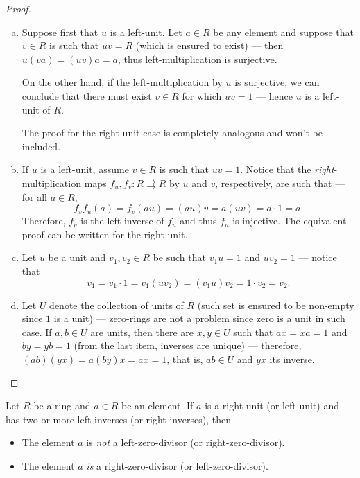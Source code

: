 %
\begin{proof}
\begin{enumerate}[(a)]\setlength\itemsep{0em}
\item Suppose first that \(u\) is a left-unit. Let \(a \in R\) be any element
  and suppose that \(v \in R\) is such that \(u v = R\) (which is ensured to
  exist) --- then \(u (v a) = (u v) a = a\), thus left-multiplication is
  surjective.

  On the other hand, if the left-multiplication by \(u\) is surjective, we can
  conclude that there must exist \(v \in R\) for which \(u v = 1\) --- hence
  \(u\) is a left-unit of \(R\).

  The proof for the right-unit case is completely analogous and won't be
  included.

\item If \(u\) is a left-unit, assume \(v \in R\) is such that
  \(u v = 1\). Notice that the \emph{right}-multiplication maps
  \(f_u, f_v: R \rightrightarrows R\) by \(u\) and \(v\), respectively, are such
  that --- for all \(a \in R\),
  \[
    f_v f_u(a) = f_v(a u) = (a u) v = a (u v) = a \cdot 1 = a.
  \]
  Therefore, \(f_v\) is the left-inverse of \(f_u\) and thus \(f_u\) is
  injective. The equivalent proof can be written for the right-unit.

\item Let \(u\) be a unit and \(v_1, v_2 \in R\) be such that \(v_1 u = 1\) and
  \(u v_2 = 1\) --- notice that
  \[
    v_1 = v_1 \cdot 1 = v_1 (u v_2) = (v_1 u) v_2 = 1 \cdot v_2 = v_2.
  \]


\item Let \(U\) denote the collection of units of \(R\) (such set is ensured to
  be non-empty since \(1\) is a unit) --- zero-rings are not a problem since
  zero is a unit in such case. If \(a, b \in U\) are units, then there are
  \(x, y \in U\) such that \(a x = x a = 1\) and \(b y = y b = 1\) (from the
  last item, inverses are unique) --- therefore,
  \((a b) (y x) = a (b y) x = a x = 1\), that is, \(a b \in U\) and \(y x\)
  its inverse.
\end{enumerate}
\end{proof}
%

%
\begin{lemma}
\label{lem:unit-two-or-more-inverses}
Let \(R\) be a ring and \(a \in R\) be an element. If \(a\) is a right-unit (or
left-unit) and has two or more left-inverses (or right-inverses), then
\begin{itemize}\setlength\itemsep{0em}
\item The element \(a\) is \emph{not} a left-zero-divisor (or
  right-zero-divisor).
\item The element \(a\) \emph{is} a right-zero-divisor (or left-zero-divisor).
\end{itemize}
\end{lemma}
%

